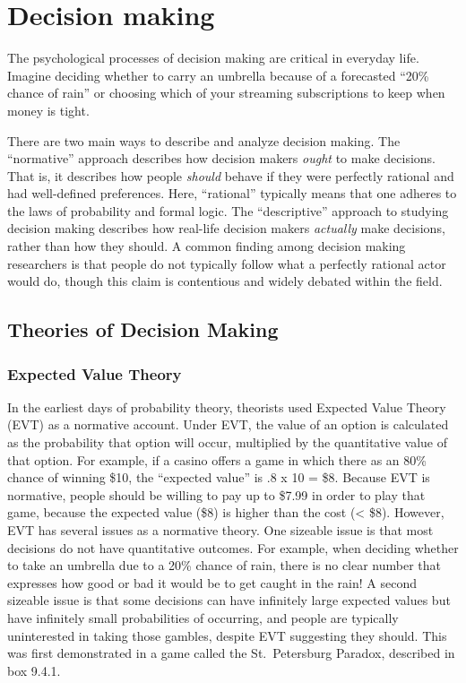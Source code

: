 \documentclass[
]{krantz}
\begin{document}
\section{Decision making}\label{decision-making}

The psychological processes of decision making are critical in everyday life. Imagine deciding whether to carry an umbrella because of a forecasted ``20\% chance of rain'' or choosing which of your streaming subscriptions to keep when money is tight.

There are two main ways to describe and analyze decision making. The ``normative'' approach describes how decision makers \emph{ought} to make decisions. That is, it describes how people \emph{should} behave if they were perfectly rational and had well-defined preferences. Here, ``rational'' typically means that one adheres to the laws of probability and formal logic. The ``descriptive'' approach to studying decision making describes how real-life decision makers \emph{actually} make decisions, rather than how they should. A common finding among decision making researchers is that people do not typically follow what a perfectly rational actor would do, though this claim is contentious and widely debated within the field.

\subsection*{Theories of Decision Making}\label{theories-of-decision-making}


\subsubsection*{Expected Value Theory}\label{expected-value-theory}


In the earliest days of probability theory, theorists used Expected Value Theory (EVT) as a normative account. Under EVT, the value of an option is calculated as the probability that option will occur, multiplied by the quantitative value of that option. For example, if a casino offers a game in which there as an 80\% chance of winning \$10, the ``expected value'' is .8 x 10 = \$8. Because EVT is normative, people should be willing to pay up to \$7.99 in order to play that game, because the expected value (\$8) is higher than the cost (\textless{} \$8). However, EVT has several issues as a normative theory. One sizeable issue is that most decisions do not have quantitative outcomes. For example, when deciding whether to take an umbrella due to a 20\% chance of rain, there is no clear number that expresses how good or bad it would be to get caught in the rain! A second sizeable issue is that some decisions can have infinitely large expected values but have infinitely small probabilities of occurring, and people are typically uninterested in taking those gambles, despite EVT suggesting they should. This was first demonstrated in a game called the St.~Petersburg Paradox, described in box 9.4.1.
\end{document}
